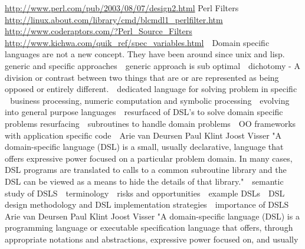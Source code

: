 \url{http://www.perl.com/pub/2003/08/07/design2.html}
Perl Filters 
\newline 
\url{http://linux.about.com/library/cmd/blcmdl1_perlfilter.htm}    
\newline 
\url{http://www.coderaptors.com/?Perl_Source_Filters}
\newline 
\url{http://www.kichwa.com/quik_ref/spec_variables.html}
\newline 
Domain specific languages are not a new concept.  They have been around since unix and lisp.
\newline 
generic and specific approaches
\newline 
generic approach is sub optimal
\newline 
dichotomy - A division or contrast between two things that are or are represented as being opposed or entirely different.
\newline 
dedicated language for solving problem in specific 
\newline 
business processing, numeric computation and symbolic processing
\newline 
evolving into general purpose languages
\newline 
resurfaced of DSL's to solve domain specific problems resurfacing
\newline 
subroutines to handle domain problems
\newline 
OO frameworks with application specific code
\newline 
Arie van Deursen Paul Klint Joost Visser 
"A domain-specific language (DSL) is a small, usually
declarative, language that offers expressive power focused
on a particular problem domain. In many cases,
DSL programs are translated to calls to a common subroutine
library and the DSL can be viewed as a means to
hide the details of that library."
\newline 
semantic study of DSLS
\newline 
terminology
\newline 
risks and opportunities
\newline 
example DSLs
\newline 
DSL design methodology and DSL implementation strategies
\newline 
importance of DSLS
\newline 
Arie van Deursen Paul Klint Joost Visser 
"A domain-specific language (DSL) is a programming
language or executable specification language
that offers, through appropriate notations and abstractions,
expressive power focused on, and usually
